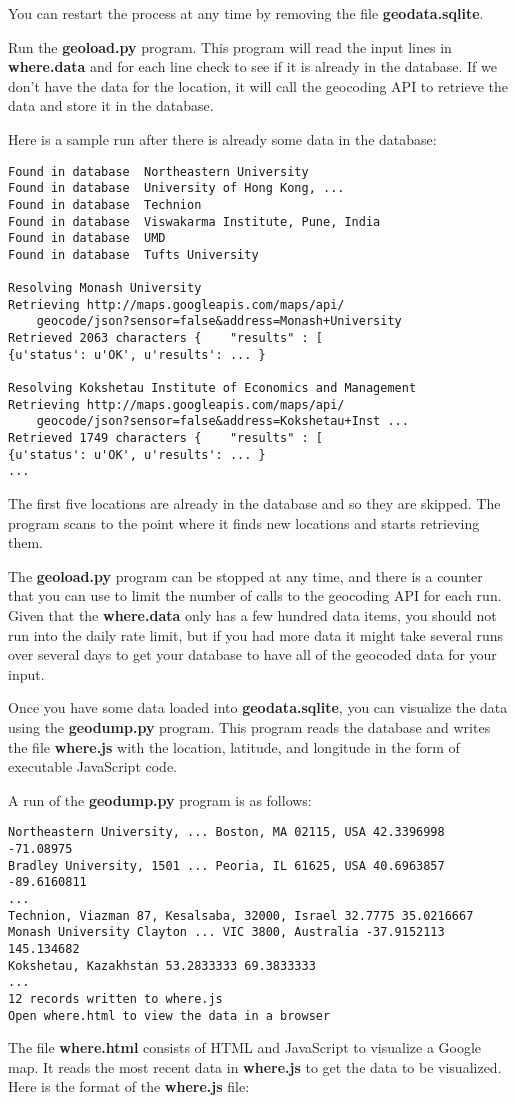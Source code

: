 You can restart the process at any time by removing the file
{\bf geodata.sqlite}.

Run the {\bf geoload.py} program.   This program will read the input
lines in {\bf where.data} and for each line check to see if it is already
in the database.  If we don't have the data for the location, it will
call the geocoding API to retrieve the data and store it in 
the database.

Here is a sample run after there is already some data in the 
database:

\beforeverb
\begin{verbatim}
Found in database  Northeastern University
Found in database  University of Hong Kong, ...
Found in database  Technion
Found in database  Viswakarma Institute, Pune, India
Found in database  UMD
Found in database  Tufts University

Resolving Monash University
Retrieving http://maps.googleapis.com/maps/api/
    geocode/json?sensor=false&address=Monash+University
Retrieved 2063 characters {    "results" : [  
{u'status': u'OK', u'results': ... }

Resolving Kokshetau Institute of Economics and Management
Retrieving http://maps.googleapis.com/maps/api/
    geocode/json?sensor=false&address=Kokshetau+Inst ...
Retrieved 1749 characters {    "results" : [  
{u'status': u'OK', u'results': ... }
...
\end{verbatim}
\afterverb
%
The first five locations are already in the database and so they 
are skipped.  The program scans to the point where it finds new
locations and starts retrieving them.

The {\bf geoload.py} program can be stopped at any time, and there is a counter 
that you can use to limit the number of calls to the geocoding
API for each run.  Given that the {\bf where.data} only has a few hundred
data items, you should not run into the daily rate limit, but if you 
had more data it might take several runs over several days to 
get your database to have all of the geocoded data for your input.

Once you have some data loaded into {\bf geodata.sqlite}, you can 
visualize the data using the {\bf geodump.py} program.  This
program reads the database and writes the file {\bf where.js}
with the location, latitude, and longitude in the form of
executable JavaScript code.   

A run of the {\bf geodump.py} program is as follows:

\beforeverb
\begin{verbatim}
Northeastern University, ... Boston, MA 02115, USA 42.3396998 -71.08975
Bradley University, 1501 ... Peoria, IL 61625, USA 40.6963857 -89.6160811
...
Technion, Viazman 87, Kesalsaba, 32000, Israel 32.7775 35.0216667
Monash University Clayton ... VIC 3800, Australia -37.9152113 145.134682
Kokshetau, Kazakhstan 53.2833333 69.3833333
...
12 records written to where.js
Open where.html to view the data in a browser
\end{verbatim}
\afterverb
%
The file {\bf where.html} consists of HTML and JavaScript to visualize 
a Google map.  It reads the most recent data in {\bf where.js} to get 
the data to be visualized.  Here is the format of the {\bf where.js} file:

